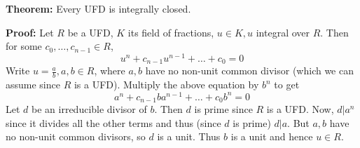 \documentclass[12pt]{article}
\begin{document}
\textbf{Theorem:} Every UFD is integrally closed.

\textbf{Proof:} Let $R$ be a UFD, $K$ its field of fractions, $u\in K, u$ integral over $R$. Then for some $c_0,\ldots,c_{n-1}\in R$,
\[u^n+c_{n-1}u^{n-1}+\ldots+c_0=0\]
Write $u=\frac{a}{b}, a,b\in R$, where $a,b$ have no non-unit common divisor (which we can assume since $R$ is a UFD). Multiply the above equation by $b^n$ to get
\[a^n+c_{n-1}ba^{n-1}+\ldots+c_0b^n=0\]
Let $d$ be an irreducible divisor of $b$. Then $d$ is prime since $R$ is a UFD. Now, $d\lvert a^n$ since it divides all the other terms and thus (since $d$ is prime) $d\lvert a$. But $a, b$ have no non-unit common divisors, so $d$ is a unit. Thus $b$ is a unit and hence $u\in R$.
\end{document}
